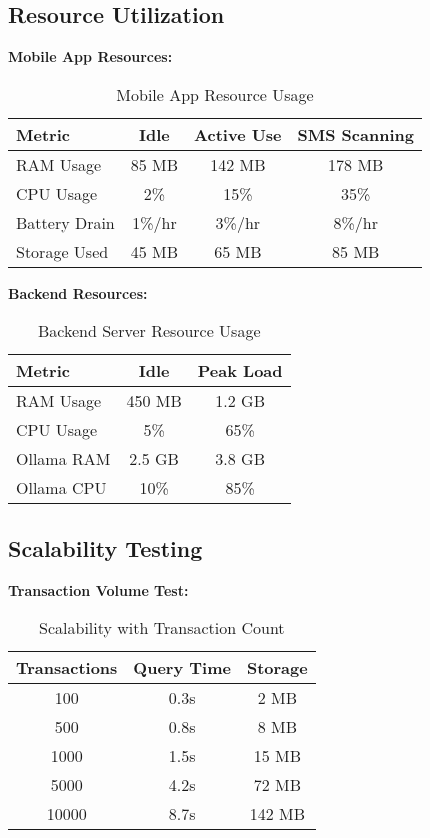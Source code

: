 \documentclass[11pt,a4paper]{report}
\begin{document}
\subsection{Resource Utilization}

\textbf{Mobile App Resources:}
\begin{table}[H]
\centering
\caption{Mobile App Resource Usage}
\begin{tabular}{|l|c|c|c|}
\hline
\textbf{Metric} & \textbf{Idle} & \textbf{Active Use} & \textbf{SMS Scanning} \\
\hline
RAM Usage & 85 MB & 142 MB & 178 MB \\
CPU Usage & 2\% & 15\% & 35\% \\
Battery Drain & 1\%/hr & 3\%/hr & 8\%/hr \\
Storage Used & 45 MB & 65 MB & 85 MB \\
\hline
\end{tabular}
\end{table}

\textbf{Backend Resources:}
\begin{table}[H]
\centering
\caption{Backend Server Resource Usage}
\begin{tabular}{|l|c|c|}
\hline
\textbf{Metric} & \textbf{Idle} & \textbf{Peak Load} \\
\hline
RAM Usage & 450 MB & 1.2 GB \\
CPU Usage & 5\% & 65\% \\
Ollama RAM & 2.5 GB & 3.8 GB \\
Ollama CPU & 10\% & 85\% \\
\hline
\end{tabular}
\end{table}

\subsection{Scalability Testing}

\textbf{Transaction Volume Test:}
\begin{table}[H]
\centering
\caption{Scalability with Transaction Count}
\begin{tabular}{|c|c|c|}
\hline
\textbf{Transactions} & \textbf{Query Time} & \textbf{Storage} \\
\hline
100 & 0.3s & 2 MB \\
500 & 0.8s & 8 MB \\
1000 & 1.5s & 15 MB \\
5000 & 4.2s & 72 MB \\
10000 & 8.7s & 142 MB \\
\hline
\end{tabular}
\end{table}
\end{document}
